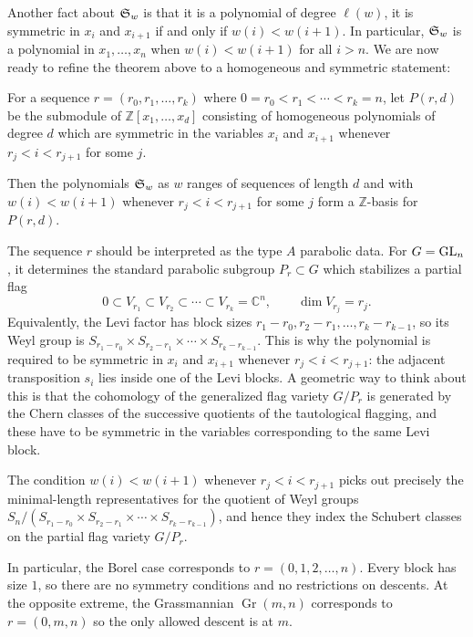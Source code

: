 \documentclass[12pt]{article}
\begin{document}
Another fact about $\mathfrak{S}_w$ is that it is a polynomial of degree $\ell(w)$, it is symmetric in $x_i$ and $x_{i+1}$ if and only if $w(i)<w(i+1)$. In particular, $\mathfrak{S}_w$ is a polynomial in $x_1,\dots,x_n$ when $w(i)<w(i+1)$ for all $i>n$. We are now ready to refine the theorem above to a homogeneous and symmetric statement:

\begin{theorem}
    For a sequence $r = (r_0,r_1,\dots,r_k)$ where $0 = r_0 < r_1 < \cdots < r_k = n$, let $P(r,d)$ be the submodule of $\mathbb Z[x_1,\dots,x_d]$ consisting of homogeneous polynomials of degree $d$ which are symmetric in the variables $x_i$ and $x_{i+1}$ whenever $r_j < i < r_{j+1}$ for some $j$.

    Then the polynomials $\mathfrak{S}_w$ as $w$ ranges of sequences of length $d$ and with $w(i)<w(i+1)$ whenever $r_j < i < r_{j+1}$ for some $j$ form a $\mathbb Z$-basis for $P(r,d)$.
\end{theorem}

\begin{remark}
    The sequence $r$ should be interpreted as the type $A$ parabolic data. For
    $G=\operatorname{GL}_n$, it determines the standard parabolic subgroup $P_r\subset G$
    which stabilizes a partial flag
    \[
        0\subset V_{r_1}\subset V_{r_2}\subset\cdots\subset V_{r_k}=\mathbb C^n,
        \qquad
        \dim V_{r_j}=r_j.
    \]
    Equivalently, the Levi factor has block sizes $r_1-r_0,r_2-r_1,\ldots,r_k-r_{k-1}$, so its Weyl group is $S_{r_1-r_0}\times S_{r_2-r_1}\times\cdots\times S_{r_k-r_{k-1}}$. This is why the polynomial is required to be symmetric in $x_i$ and
    $x_{i+1}$ whenever $r_j<i<r_{j+1}$: the adjacent transposition $s_i$
    lies inside one of the Levi blocks. A geometric way to think about this is that the cohomology of the generalized flag variety $G/P_r$ is generated by the Chern classes of the successive quotients of the tautological flagging, and these have to be symmetric in the variables corresponding to the same Levi block.


    The condition $w(i)<w(i+1)$ whenever $r_j<i<r_{j+1}$ picks out precisely the minimal-length representatives for the quotient of Weyl groups $S_n/(S_{r_1-r_0}\times S_{r_2-r_1}\times\cdots\times S_{r_k-r_{k-1}})$, and hence they index the Schubert classes on the partial flag variety
    $G/P_r$.

    In particular, the Borel case corresponds to $r=(0,1,2,\ldots,n)$.
    Every block has size $1$, so there are no symmetry conditions and no
    restrictions on descents. At the opposite extreme, the Grassmannian $\operatorname{Gr}(m,n)$ corresponds to $r=(0,m,n)$ so the only allowed descent is at $m$.
\end{remark}
\end{document}
